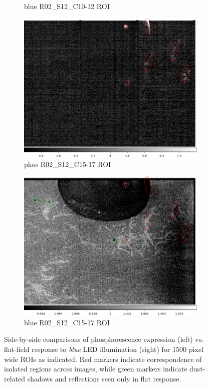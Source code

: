 \begin{figure}[!htbp]
\begin{subfigure}{0.30\textwidth}
     \caption{blue  R02\_S12\_C10-12 ROI}
     \label{subfig:comp:blue:R02_S12_C10}
\end{subfigure}
\newline
\begin{subfigure}{0.30\textwidth}
    \includegraphics[width=\textwidth]{figures/phosphorescence-survey/comp_phos_R02_S12_C14-7.png}
     \caption{phos  R02\_S12\_C15-17 ROI}
     \label{subfig:comp:phos:R02_S12_C15}
\end{subfigure}
\hfil
\begin{subfigure}{0.30\textwidth}
    \includegraphics[width=\textwidth]{figures/phosphorescence-survey/comp_blue_R02_S12_C14-7.png}
     \caption{blue  R02\_S12\_C15-17 ROI}
     \label{subfig:comp:blue:R02_S12_C15}
\end{subfigure}
\newline
\caption{Side-by-side comparisons of phosphorescence expression (left) vs. flat-field response to {\it blue} LED illumination (right) for 1500 pixel wide ROIs as indicated. Red markers indicate correspondence of isolated regions across images, while green markers indicate dust-related shadows and reflections seen only in flat response.}
\label{fig:blue-phos:R02_S12:rois}
\end{figure}


